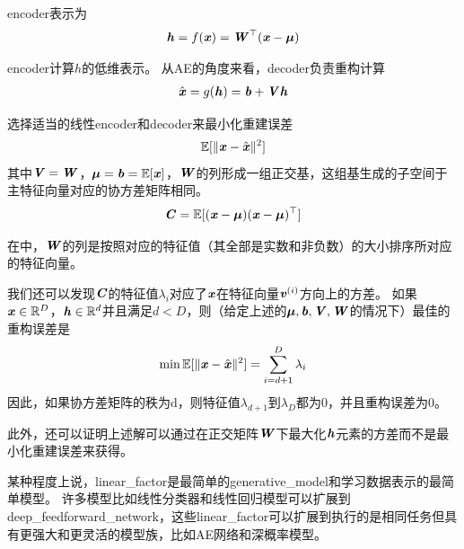 \gls{encoder}表示为
\begin{align}
\label{eqn:1319}
\Vh  = f(\Vx) = \MW^{\top} (\Vx - \Vmu)
\end{align}


\gls{encoder}计算$h$的低维表示。
从\gls{AE}的角度来看，\gls{decoder}负责重构计算
\begin{align}
\label{eqn:1320}
\hat{\Vx} = g(\Vh) = \Vb + \MV \Vh
\end{align}


选择适当的线性\gls{encoder}和\gls{decoder}来最小化重建误差
\begin{align}
\label{eqn:1321}
\SetE[\Vert\Vx - \hat{\Vx}\Vert^2]
\end{align}
其中$\boldsymbol{\mathit{V}} = \boldsymbol{\mathit{W}}$，${\boldsymbol{\mu}} = \boldsymbol{\mathit{b}} = \mathbb{E}[\boldsymbol{\mathit{x}}] $，$\boldsymbol{\mathit{W}}$的列形成一组正交基，这组基生成的子空间于主特征向量对应的协方差矩阵相同。
\begin{align}
\label{eqn:1322}
\MC = \SetE[(\Vx - {\Vmu})(\Vx - {\Vmu})^{\top}]
\end{align}



在中，$\boldsymbol{\mathit{W}}$的列是按照对应的特征值（其全部是实数和非负数）的大小排序所对应的特征向量。

我们还可以发现$\boldsymbol{\mathit{C}}$的特征值$\lambda_i$对应了$\boldsymbol{\mathit{x}}$在特征向量$\boldsymbol{\mathit{v}}^{(i)}$方向上的方差。
如果$\boldsymbol{\mathit{x}}\in \mathbb{R}^D$，$\boldsymbol{\mathit{h}}\in\mathbb{R}^d$并且满足$d<D$，则（给定上述的${\boldsymbol{\mu}},\boldsymbol{\mathit{b}},\boldsymbol{\mathit{V}},\boldsymbol{\mathit{W}}$的情况下）最佳的重构误差是
\begin{align}
\label{eqn:1323}
\min \SetE[\Vert \Vx - \hat{\Vx} \Vert^2]
 = \sum_{i=d+1}^{D}\lambda_i
\end{align}
因此，如果协方差矩阵的秩为d，则特征值$\lambda_{d+1}$到$\lambda_{D}$都为0，并且重构误差为0。

此外，还可以证明上述解可以通过在正交矩阵$\boldsymbol{\mathit{W}}$下最大化$\boldsymbol{\mathit{h}}$元素的方差而不是最小化重建误差来获得。


某种程度上说，\gls{linear_factor}是最简单的\gls{generative_model}和学习数据表示的最简单模型。
许多模型比如线性分类器和线性回归模型可以扩展到\gls{deep_feedforward_network}，这些\gls{linear_factor}可以扩展到执行的是相同任务但具有更强大和更灵活的模型族，比如\gls{AE}网络和深概率模型。














